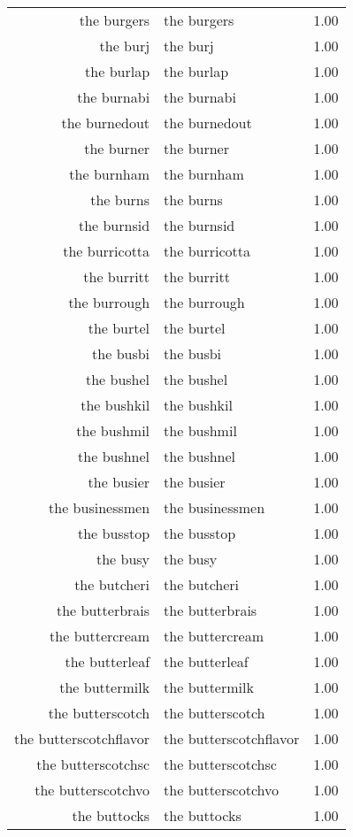 \begin{table}[ht]
\begin{tabular}{rlr}
  the burgers & the burgers & 1.00 \\ 
  the burj & the burj & 1.00 \\ 
  the burlap & the burlap & 1.00 \\ 
  the burnabi & the burnabi & 1.00 \\ 
  the burnedout & the burnedout & 1.00 \\ 
  the burner & the burner & 1.00 \\ 
  the burnham & the burnham & 1.00 \\ 
  the burns & the burns & 1.00 \\ 
  the burnsid & the burnsid & 1.00 \\ 
  the burricotta & the burricotta & 1.00 \\ 
  the burritt & the burritt & 1.00 \\ 
  the burrough & the burrough & 1.00 \\ 
  the burtel & the burtel & 1.00 \\ 
  the busbi & the busbi & 1.00 \\ 
  the bushel & the bushel & 1.00 \\ 
  the bushkil & the bushkil & 1.00 \\ 
  the bushmil & the bushmil & 1.00 \\ 
  the bushnel & the bushnel & 1.00 \\ 
  the busier & the busier & 1.00 \\ 
  the businessmen & the businessmen & 1.00 \\ 
  the busstop & the busstop & 1.00 \\ 
  the busy & the busy & 1.00 \\ 
  the butcheri & the butcheri & 1.00 \\ 
  the butterbrais & the butterbrais & 1.00 \\ 
  the buttercream & the buttercream & 1.00 \\ 
  the butterleaf & the butterleaf & 1.00 \\ 
  the buttermilk & the buttermilk & 1.00 \\ 
  the butterscotch & the butterscotch & 1.00 \\ 
  the butterscotchflavor & the butterscotchflavor & 1.00 \\ 
  the butterscotchsc & the butterscotchsc & 1.00 \\ 
  the butterscotchvo & the butterscotchvo & 1.00 \\ 
  the buttocks & the buttocks & 1.00 \\ 

\end{tabular}
\end{table}
